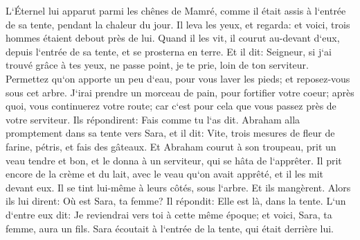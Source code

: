 \verse L`Éternel lui apparut parmi les chênes de Mamré, comme il était assis à l`entrée de sa tente, pendant la chaleur du jour. 
\verse Il leva les yeux, et regarda: et voici, trois hommes étaient debout près de lui. Quand il les vit, il courut au-devant d`eux, depuis l`entrée de sa tente, et se prosterna en terre. 
\verse Et il dit: Seigneur, si j`ai trouvé grâce à tes yeux, ne passe point, je te prie, loin de ton serviteur. 
\verse Permettez qu`on apporte un peu d`eau, pour vous laver les pieds; et reposez-vous sous cet arbre. 
\verse J`irai prendre un morceau de pain, pour fortifier votre coeur; après quoi, vous continuerez votre route; car c`est pour cela que vous passez près de votre serviteur. Ils répondirent: Fais comme tu l`as dit. 
\verse Abraham alla promptement dans sa tente vers Sara, et il dit: Vite, trois mesures de fleur de farine, pétris, et fais des gâteaux. 
\verse Et Abraham courut à son troupeau, prit un veau tendre et bon, et le donna à un serviteur, qui se hâta de l`apprêter. 
\verse Il prit encore de la crème et du lait, avec le veau qu`on avait apprêté, et il les mit devant eux. Il se tint lui-même à leurs côtés, sous l`arbre. Et ils mangèrent. 
\verse Alors ils lui dirent: Où est Sara, ta femme? Il répondit: Elle est là, dans la tente. 
\verse L`un d`entre eux dit: Je reviendrai vers toi à cette même époque; et voici, Sara, ta femme, aura un fils. Sara écoutait à l`entrée de la tente, qui était derrière lui. 
